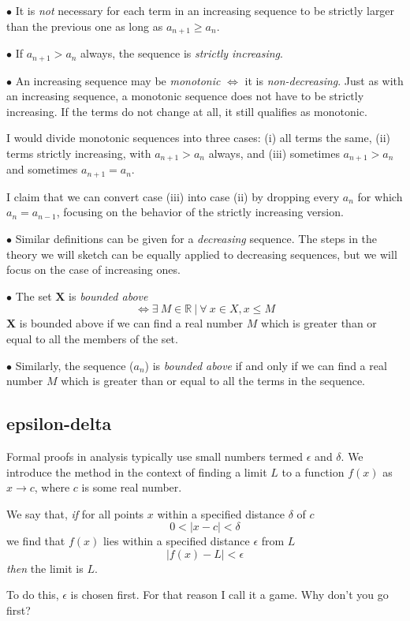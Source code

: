 \documentclass[11pt, oneside]{article}   	%
\begin{document}
$\bullet$  It is \emph{not} necessary for each term in an increasing sequence to be strictly larger than the previous one as long as $a_{n+1} \ge a_n$.

$\bullet$  If $a_{n+1} > a_n$ always, the sequence is \emph{strictly increasing}.

$\bullet$  An increasing sequence may be \emph{monotonic} $\iff$ it is \emph{non-decreasing}.  Just as with an increasing sequence, a monotonic sequence does not have to be strictly increasing.  If the terms do not change at all, it still qualifies as monotonic.

I would divide monotonic sequences into three cases:  (i) all terms the same, (ii) terms strictly increasing, with $a_{n+1} > a_n$ always, and (iii) sometimes $a_{n+1} > a_n$ and sometimes $a_{n+1} = a_n$.  

I claim that we can convert case (iii) into case (ii) by dropping every $a_{n}$ for which $a_n = a_{n-1}$, focusing on the behavior of the strictly increasing version.

$\bullet$  Similar definitions can be given for a \emph{decreasing} sequence.  The steps in the theory we will sketch can be equally applied to decreasing sequences, but we will focus on the case of increasing ones.

$\bullet$  The set $\mathbf{X}$ is \emph{bounded above}
\[\iff \exists \ M \in \mathbb{R} \ | \ \forall \ x \in X, x \le M\]
$\mathbf{X}$ is bounded above if we can find a real number $M$ which is greater than or equal to all the members of the set.

$\bullet$  Similarly, the sequence ($a_n$) is \emph{bounded above} if and only if we can find a real number $M$ which is greater than or equal to all the terms in the sequence.

\subsection*{epsilon-delta}
Formal proofs in analysis typically use small numbers termed $\epsilon$ and $\delta$.  We introduce the method in the context of finding a limit $L$ to a function $f(x)$ as $x \rightarrow c$, where $c$ is some real number.

We say that, \emph{if} for all points $x$ within a specified distance $\delta$ of $c$
\[  0 < | x - c| < \delta \]
we find that $f(x)$ lies within a specified distance $\epsilon$ from $L$
\[ |f(x) - L| < \epsilon \]
\emph{then} the limit is $L$.

To do this, $\epsilon$ is chosen first.  For that reason I call it a game.  Why don't you go first?  
\end{document}
